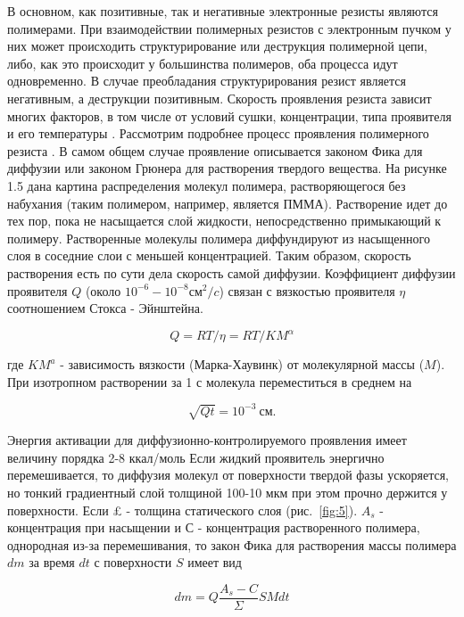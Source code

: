 В основном, как позитивные, так и негативные электронные резисты являются полимерами. При взаимодействии полимерных резистов с электронным пучком у них может происходить структурирование или деструкция полимерной цепи, либо, как это происходит у большинства полимеров, оба процесса идут одновременно. В случае преобладания структурирования резист является негативным, а деструкции позитивным. Скорость проявления резиста зависит многих факторов, в том числе от условий сушки, концентрации, типа проявителя и его температуры \cite{14}. Рассмотрим подробнее процесс проявления полимерного резиста \cite{15}. В самом общем случае проявление описывается законом Фика для диффузии или законом Грюнера для растворения твердого вещества. На рисунке 1.5 дана картина распределения молекул полимера, растворяющегося без набухания (таким полимером, например, является ПММА). Растворение идет до тех пор, пока не насыщается слой жидкости, непосредственно примыкающий к полимеру. Растворенные молекулы полимера диффундируют из насыщенного слоя в соседние слои с меньшей концентрацией. Таким образом, скорость растворения есть по сути дела скорость самой диффузии.
Коэффициент диффузии проявителя $Q$ (около $10^{-6}-10^{-8} см^2/c$) связан с вязкостью проявителя $\eta$ соотношением Стокса - Эйнштейна.

\begin{equation}
Q=RT/\eta=RT / KM^{\alpha}
\label{eq:A12}
\end{equation}

где $KM^a$ - зависимость вязкости (Марка-Хаувинк) от молекулярной массы ($M$). При изотропном растворении за 1 с молекула переместиться в среднем на 

\begin{equation}
\sqrt{Qt}=10^{-3}~\text{см}.
\label{eq:A13}
\end{equation}

Энергия активации для диффузионно-контролируемого проявления имеет величину порядка 2-8 ккал/моль \cite{16}
Если жидкий проявитель энергично перемешивается, то диффузия молекул от поверхности твердой фазы ускоряется, но тонкий градиентный слой толщиной 100-10 мкм при этом прочно держится у поверхности. Если £ - толщина статического слоя (рис.~\ref{fig:5}). $A_s$ - концентрация при насыщении и $С$ - концентрация растворенного полимера, однородная из-за перемешивания, то закон Фика для растворения массы полимера $dm$ за время $dt$ с поверхности $S$ имеет вид

\begin{equation}
dm=Q\frac{A_s -C}{\Sigma} SMdt
\label{eq:A14}
\end{equation}

